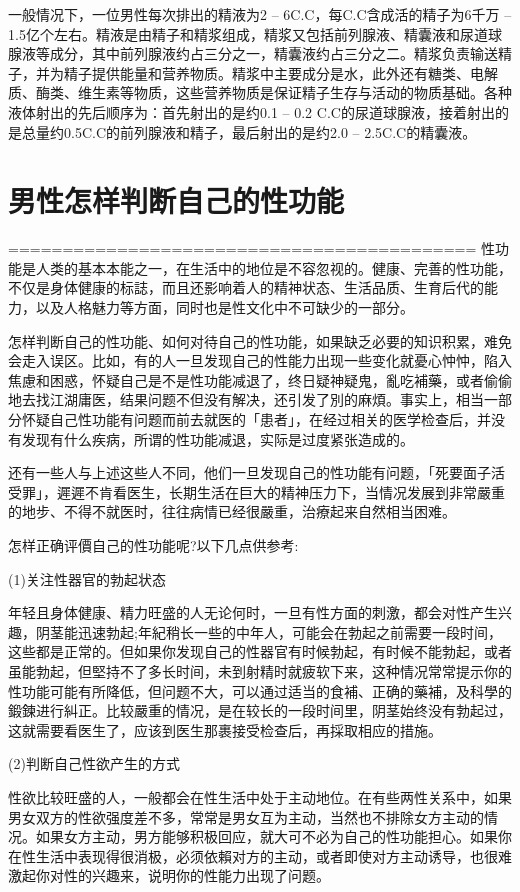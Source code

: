 \documentclass[12pt,UTF8]{ctexbook}
\begin{document}
一般情况下，一位男性每次排出的精液为2 -- 6C.C，每C.C含成活的精子为6千万 -- 1.5亿个左右。精液是由精子和精浆组成，精浆又包括前列腺液、精囊液和尿道球腺液等成分，其中前列腺液约占三分之一，精囊液约占三分之二。精浆负责输送精子，并为精子提供能量和营养物质。精浆中主要成分是水，此外还有糖类、电解质、酶类、维生素等物质，这些营养物质是保证精子生存与活动的物质基础。各种液体射出的先后顺序为：首先射出的是约0.1 -- 0.2 C.C的尿道球腺液，接着射出的是总量约0.5C.C的前列腺液和精子，最后射出的是约2.0 -- 2.5C.C的精囊液。

\section{男性怎样判断自己的性功能}
===========================================
性功能是人类的基本本能之一，在生活中的地位是不容忽视的。健康、完善的性功能，不仅是身体健康的标誌，而且还影响着人的精神状态、生活品质、生育后代的能力，以及人格魅力等方面，同时也是性文化中不可缺少的一部分。

怎样判断自己的性功能、如何对待自己的性功能，如果缺乏必要的知识积累，难免会走入误区。比如，有的人一旦发现自己的性能力出现一些变化就憂心忡忡，陷入焦慮和困惑，怀疑自己是不是性功能减退了，终日疑神疑鬼，亂吃補藥，或者偷偷地去找江湖庸医，结果问题不但没有解决，还引发了別的麻煩。事实上，相当一部分怀疑自己性功能有问题而前去就医的「患者」，在经过相关的医学检查后，并没有发现有什么疾病，所谓的性功能减退，实际是过度紧张造成的。

还有一些人与上述这些人不同，他们一旦发现自己的性功能有问题，「死要面子活受罪」，遲遲不肯看医生，长期生活在巨大的精神压力下，当情况发展到非常嚴重的地步、不得不就医时，往往病情已经很嚴重，治療起来自然相当困难。

怎样正确评價自己的性功能呢?以下几点供参考:

(1)关注性器官的勃起状态

年轻且身体健康、精力旺盛的人无论何时，一旦有性方面的刺激，都会对性产生兴趣，阴茎能迅速勃起;年紀稍长一些的中年人，可能会在勃起之前需要一段时间，这些都是正常的。但如果你发现自己的性器官有时候勃起，有时候不能勃起，或者虽能勃起，但堅持不了多长时间，未到射精时就疲软下来，这种情况常常提示你的性功能可能有所降低，但问题不大，可以通过适当的食補、正确的藥補，及科學的鍛鍊进行糾正。比较嚴重的情况，是在较长的一段时间里，阴茎始终没有勃起过，这就需要看医生了，应该到医生那裹接受检查后，再採取相应的措施。

(2)判断自己性欲产生的方式

性欲比较旺盛的人，一般都会在性生活中处于主动地位。在有些两性关系中，如果男女双方的性欲强度差不多，常常是男女互为主动，当然也不排除女方主动的情况。如果女方主动，男方能够积极回应，就大可不必为自己的性功能担心。如果你在性生活中表现得很消极，必须依賴对方的主动，或者即使对方主动诱导，也很难激起你对性的兴趣来，说明你的性能力出现了问题。
\end{document}
